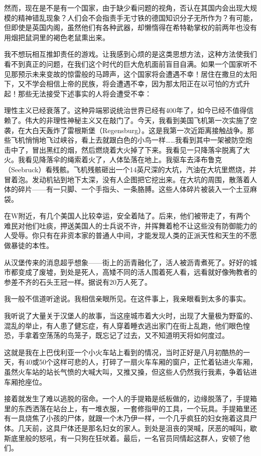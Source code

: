 \documentclass[UTF8]{ctexart}
\begin{document}
然而，现在是不是有一个国家，由于缺少看问题的视角，否认在其国内会出现大规模的精神错乱现象？人们会不会指责手无寸铁的德国知识分子无所作为？有可能，但即使是英国内阁，虽然他们有各种武器，却懒惰得在希特勒掌权的前两年也没有用烟把鼠洞里的褐色老鼠熏出来。

我不想玩相互推卸责任的游戏。让我感到心烦的是这类思想方法，这种方法使我们看不到真正的问题，在我们这个时代的巨大危机面前盲目自满。如果一个国家听不见那预示未来变故的惊雷般的马蹄声，这个国家将会遭遇不幸！居住在撒旦的太阳下，又不学会相信上帝的民族，将会遭遇不幸，因为那太阳正在以可怕的方式升起！那些无法接受下述事实的人将会遭受不幸：

理性主义已经衰落了。这种异端邪说统治世界已经有400年了，如今已经不值得信赖了。伟大的非理性神秘主义又在敲门了。今天，我看到美国飞机第一次实施了空袭，在大白天轰炸了雷根斯堡（Regensburg）。这是我第一次近距离接触战争。那些飞机悄悄地飞过峡谷，看上去就跟白色的小鸟一样……我看到其中一架被防空炮击中了，冒出黑红的烟，然后燃烧着大火掉了下来。我看见一只降落伞脱离了大火。我看见降落伞的绳索着火了，人体坠落在地上。我驱车去泽布鲁克（Seebruck）看残骸。飞机残骸砸出一个14英尺深的大坑，汽油在大坑里燃烧，并冒着泡。发动机钻到地下太深，没有人企图把它挖出来。在大坑的周围，散落着人体的碎片——有一只脚、一个手指头、一条胳膊。这些人体碎片被装入一个土豆麻袋。

在W附近，有几个美国人比较幸运，安全着陆了。后来，他们被带走了，有两个难民对他们吐痰，押送美国人的士兵说不许，并挥舞着枪不让这些没有防御能力的人受辱。你只有在非资本家的普通人中间，才能发现人类的正派天性和天生的不愿做暴徒的本性。

从汉堡传来的消息超乎想象——街上的沥青融化了，活人被沥青煮死了。好好的城市都变成了废墟，到处是死人，高矮不同的活人围着死人看，远看就好像殉教者的参差不齐的石头王冠一样。据说有20万人死了。

我一般不信道听途说。我相信亲眼所见。在这件事上，我亲眼看到太多的事实。

我听说了大量关于汉堡人的故事，当这座城市着大火时，出现了大量极为野蛮的、混乱的举止，有人患了健忘症，有人穿着睡衣逃出家门在街上乱跑，他们眼色惶恐，手拿着空荡荡的鸟笼子，既忘记了过去，又不知道明天将如何度过。

这就是我在上巴伐利亚一个小火车站上看到的情况，当时正好是八月初酷热的一天，有40或50个这样可悲的人，打碎了一扇火车车厢的窗户，正忙着钻进火车厢，虽然火车站的站长气愤的大喊大叫，又推又搡，但这些人仍然我行我素，争着钻进车厢抢座位。

接着就发生了难以逃脱的宿命。一个人的手提箱是纸板做的，边缘脱落了，手提箱里的东西洒落在站台上，有一堆衣服，一套修指甲的工具，一个玩具。手提箱里还有一具烧焦了小孩的尸体，就跟一个木乃伊一样，一个几乎疯狂的妇女拖着这具尸体。几天前，这具尸体还是那名妇女的家人。到处是沮丧的哭喊，厌恶的喊叫，歇斯底里般的怒吼，有一只狗在狂吠着。最后，一名官员同情起这群人，安顿了他们。
\end{document}
